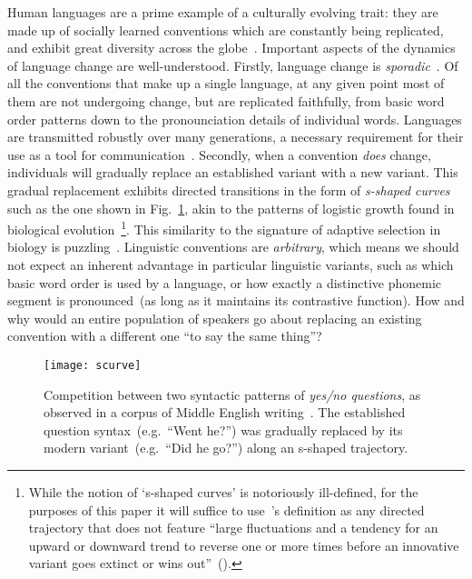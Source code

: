 \documentclass[10pt]{article}
\begin{document}
Human languages are a prime example of a culturally evolving trait: they are made up of socially learned conventions which are constantly being replicated, and exhibit great diversity across the globe~\citep{Evans2009}. Important aspects of the dynamics of language change are well-understood. Firstly, language change is \emph{sporadic}~\citep{Saussure1959,Labov2001}. Of all the conventions that make up a single language, at any given point most of them are not undergoing change, but are replicated faithfully, from basic word order patterns down to the pronounciation details of individual words. 
Languages are transmitted robustly over many generations, a necessary requirement for their use as a tool for communication~\citep{Lewis2012}. Secondly, when a convention \emph{does} change, individuals will gradually replace an established variant with a new variant. This gradual replacement exhibits directed transitions in the form of \emph{s-shaped curves} such as the one shown in Fig.~\ref{fig:scurve}, akin to the patterns of logistic growth found in biological evolution~\citep{Bailey1973,Altmann1983,Kroch1989cr,Denison2003,Blythe2012}\footnote{While the notion of `s-shaped curves' is notoriously ill-defined, for the purposes of this paper it will suffice to use~\citeauthor{Blythe2012}'s definition as any directed trajectory that does not feature ``large fluctuations and a tendency for an upward or downward trend to reverse one or more times before an innovative variant goes extinct or wins out''~(\citeyear[p.285]{Blythe2012}).}. This similarity to the signature of adaptive selection in biology is puzzling~\citep[ch.1]{Labov2001}. Linguistic conventions are \emph{arbitrary}, which means we should not expect an inherent advantage in particular linguistic variants, such as which basic word order is used by a language, or how exactly a distinctive phonemic segment is pronounced~(as long as it maintains its contrastive function). How and why would an entire population of speakers go about replacing an existing convention with a different one ``to say the same thing''?

\begin{figure}[htb]
\centering
\texttt{[image: scurve]}
\caption[Competition between two syntactic patterns of \emph{yes/no questions}, as observed in a corpus of Middle English writing]{Competition between two syntactic patterns of \emph{yes/no questions}, as observed in a corpus of Middle English writing~\citep{Ellegard1953}. The established question syntax~(e.g.~``Went he?'') was gradually replaced by its modern variant~(e.g.~``Did he go?'') along an s-shaped trajectory.} 
\label{fig:scurve}
\end{figure}
\end{document}

